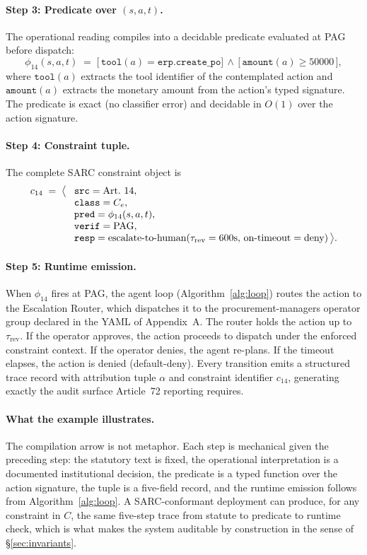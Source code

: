 \documentclass[11pt,a4paper]{article}
\theoremstyle{remark}
\begin{document}
\paragraph{Step 3: Predicate over $(s, a, t)$.} The operational reading compiles into a decidable predicate evaluated at PAG before dispatch:
\[
    \phi_{14}(s, a, t) \;=\; \bigl[\,\texttt{tool}(a) = \texttt{erp.create\_po}\bigr] \,\wedge\, \bigl[\,\texttt{amount}(a) \geq 50000\,\bigr],
\]
where $\texttt{tool}(a)$ extracts the tool identifier of the contemplated action and $\texttt{amount}(a)$ extracts the monetary amount from the action's typed signature. The predicate is exact (no classifier error) and decidable in $O(1)$ over the action signature.

\paragraph{Step 4: Constraint tuple.} The complete SARC constraint object is
\[
\setlength{\arraycolsep}{0.4em}
\begin{array}{rl}
c_{14} \;=\; \bigl\langle & \texttt{src} = \text{Art.~14}, \\
  & \texttt{class} = C_e, \\
  & \texttt{pred} = \phi_{14}(s, a, t), \\
  & \texttt{verif} = \text{PAG}, \\
  & \texttt{resp} = \text{escalate-to-human}(\tau_{\text{rev}} = 600\text{s},\, \text{on-timeout} = \text{deny}) \,\bigr\rangle.
\end{array}
\]

\paragraph{Step 5: Runtime emission.} When $\phi_{14}$ fires at PAG, the agent loop (Algorithm~\ref{alg:loop}) routes the action to the Escalation Router, which dispatches it to the procurement-managers operator group declared in the YAML of Appendix~A. The router holds the action up to $\tau_{\text{rev}}$. If the operator approves, the action proceeds to dispatch under the enforced constraint context. If the operator denies, the agent re-plans. If the timeout elapses, the action is denied (default-deny). Every transition emits a structured trace record with attribution tuple $\alpha$ and constraint identifier $c_{14}$, generating exactly the audit surface Article~72 reporting requires.

\paragraph{What the example illustrates.} The compilation arrow is not metaphor. Each step is mechanical given the preceding step: the statutory text is fixed, the operational interpretation is a documented institutional decision, the predicate is a typed function over the action signature, the tuple is a five-field record, and the runtime emission follows from Algorithm~\ref{alg:loop}. A SARC-conformant deployment can produce, for any constraint in $C$, the same five-step trace from statute to predicate to runtime check, which is what makes the system auditable by construction in the sense of \S\ref{sec:invariants}.
\end{document}
